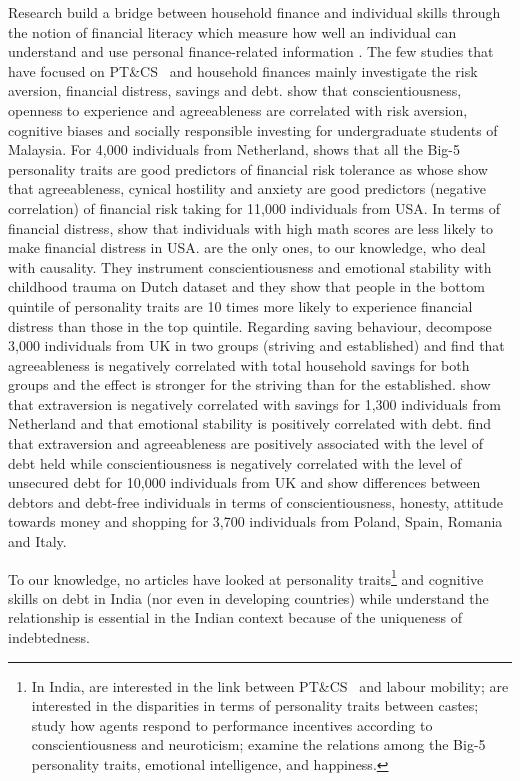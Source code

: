 \documentclass[a4paper, 12pt, onecolumn]{article}
\newcommand{\PTCS}{PT\&CS}
\begin{document}
Research build a bridge between household finance and individual skills through the notion of financial literacy which measure how well an individual can understand and use personal finance-related information \citep{Huston2010, Hastings2013, Gaurav2012, Klapper2012, Horn2021}.
The few studies that have focused on \PTCS~ and household finances mainly investigate the risk aversion, financial distress, savings and debt.
\cite{Nga2013} show that conscientiousness, openness to experience and agreeableness are correlated with risk aversion, cognitive biases and socially responsible investing for undergraduate students of Malaysia.
For 4,000 individuals from Netherland, \cite{Pinjisakikool2017b} shows that all the Big-5 personality traits are good predictors of financial risk tolerance as \cite{Bucciol2017} whose show that agreeableness, cynical hostility and anxiety are good predictors (negative correlation) of financial risk taking for 11,000 individuals from USA.
In terms of financial distress, \cite{Agarwal2013} show that individuals with high math scores are less likely to make financial distress in USA.
\cite{Parise2019} are the only ones, to our knowledge, who deal with causality.
They instrument conscientiousness and emotional stability with childhood trauma on Dutch dataset and they show that people in the bottom quintile of personality traits are 10 times more likely to experience financial distress than those in the top quintile.
Regarding saving behaviour, \cite{Gerhard2018} decompose 3,000 individuals from UK in two groups (striving and established) and find that agreeableness is negatively correlated with total household savings for both groups and the effect is stronger for the striving than for the established.
\cite{Nyhus2001} show that extraversion is negatively correlated with savings for 1,300 individuals from Netherland and that emotional stability is positively correlated with debt.
\cite{Brown2014} find that extraversion and agreeableness are positively associated with the level of debt held while conscientiousness is negatively correlated with the level of unsecured debt for 10,000 individuals from UK and \cite{Forlicz2019} show differences between debtors and debt-free individuals in terms of conscientiousness, honesty, attitude towards money and shopping for 3,700 individuals from Poland, Spain, Romania and Italy.

To our knowledge, no articles have looked at personality traits\footnote{In India,\cite{Michiels2021} are interested in the link between \PTCS~ and labour mobility; \cite{Dasgupta2020} are interested in the disparities in terms of personality traits between castes; \cite{Donato2017} study how agents respond to performance incentives according to conscientiousness and neuroticism; \cite{Hafen2010} examine the relations among the Big-5 personality traits, emotional intelligence, and happiness.} and cognitive skills on debt in India (nor even in developing countries) while understand the relationship is essential in the Indian context because of the uniqueness of indebtedness.
\end{document}
